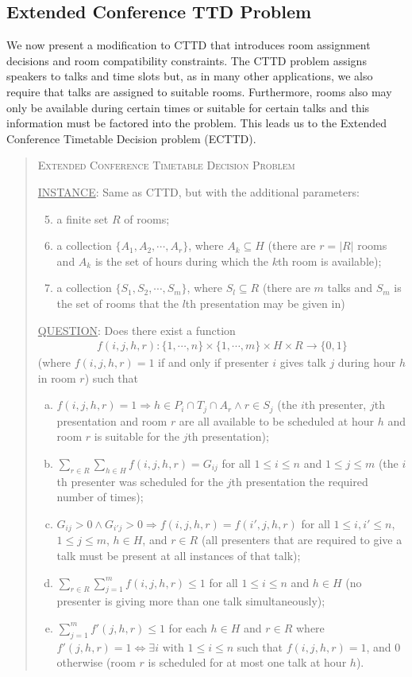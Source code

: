 \documentclass{svjour3}                     %
\begin{document}
\subsection{Extended Conference TTD Problem}
We now present a modification to CTTD that introduces room assignment decisions and room compatibility constraints.
The CTTD problem assigns speakers to talks and time slots but, as in many other applications, we also require that talks are assigned to suitable rooms.
Furthermore, rooms also may only be available during certain times or suitable for certain talks and this information must be factored into the problem. 
This leads us to the Extended Conference Timetable Decision problem (ECTTD).
\begin{quote}
	\textsc{Extended Conference Timetable Decision Problem}
	
	\underline{INSTANCE}: Same as CTTD, but with the additional parameters:
	\begin{enumerate}[1.]
		\setcounter{enumi}{4}
		\item a finite set $R$ of rooms;
		\item a collection $\{A_1,A_2,\cdots,A_r\}$, where $A_k \subseteq H$ (there are $r=|R|$ rooms and $A_k$ is the set of hours during which the $k$th room is available);
		\item a collection $\{S_1,S_2,\cdots,S_m\}$, where $S_l \subseteq R$ (there are $m$ talks and $S_m$ is the set of rooms that the $l$th presentation may be given in)
	\end{enumerate}
	\underline{QUESTION}: Does there exist a function 
	\begin{gather*}
		f(i,j,h,r) : \{1,\cdots,n\} \times \{1,\cdots,m\} \times H \times R \rightarrow \{0,1\}
	\end{gather*}
	(where $f(i,j,h,r)=1$ if and only if presenter $i$ gives talk $j$ during hour $h$ in room $r$) such that
	\begin{enumerate}[(a)]
		\item $f(i,j,h,r) = 1 \Rightarrow h \in P_i \cap T_j \cap A_r \land r \in S_j$ (the $i$th presenter, $j$th presentation and room $r$ are all available to be scheduled at hour $h$ and room $r$ is suitable for the $j$th presentation);
		\item $\sum\limits_{r \in R}\sum\limits_{h \in H} f(i,j,h,r) = G_{ij}$ for all $1 \le i \le n$ and $1 \le j \le m$ (the $i$th presenter was scheduled for the $j$th presentation the required number of times);
		\item $G_{ij} > 0 \land G_{i'j} > 0 \Rightarrow f(i,j,h,r)=f(i',j,h,r)$ for all $1 \le i,i' \le n$, $1 \le j \le m$, $h \in H$, and $r \in R$ (all presenters that are required to give a talk must be present at all instances of that talk);
		\item $\sum\limits_{r \in R}\sum\limits_{j=1}^m f(i,j,h,r) \le 1$ for all $1 \le i \le n$ and $h \in H$ (no presenter is giving more than one talk simultaneously);
		\item $\sum\limits_{j=1}^m f'(j,h,r) \le 1$ for each $h \in H$ and $r \in R$ where $f'(j,h,r) = 1 \iff \exists i \text{ with } 1 \le i \le n$ such that $f(i,j,h,r)=1$, and 0 otherwise (room $r$ is scheduled for at most one talk at hour $h$).
	\end{enumerate}
\end{quote}
\end{document}
